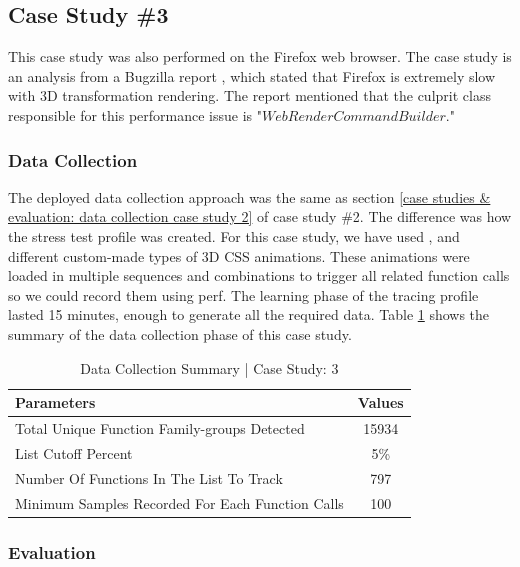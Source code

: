 \documentclass[pdflatex,sn-nature]{sn-jnl}%
\theoremstyle{thmstyleone}%
\theoremstyle{thmstyletwo}%
\theoremstyle{thmstylethree}%
\begin{document}
\subsection{Case Study \#3}\label{case studies & evaluation: case study 3}

This case study was also performed on the Firefox web browser. The case study is an analysis from a Bugzilla report \cite{muizelaar-2020}, which stated that Firefox is extremely slow with 3D transformation rendering. The report mentioned that the culprit class responsible for this performance issue is "$WebRenderCommandBuilder$."

\subsubsection{Data Collection}
The deployed data collection approach was the same as section \ref{case studies & evaluation: data collection case study 2} of case study \#2. The difference was how the stress test profile was created. For this case study, we have used \cite{loopingsquares}, \cite{3dtransformation} and different custom-made types of 3D CSS animations. These animations were loaded in multiple sequences and combinations to trigger all related function calls so we could record them using perf. The learning phase of the tracing profile lasted 15 minutes, enough to generate all the required data. Table \ref{tabledatacollectioncs3} shows the summary of the data collection phase of this case study.

\begin{table}[tbp]

\centering
\begin{tabular}{ |l|c| }
\hline
\textbf{Parameters} & \textbf{Values} \\
\hline
Total Unique Function Family-groups Detected & 15934 \\
\hline
List Cutoff Percent & 5\% \\
\hline
Number Of Functions In The List To Track & 797 \\
\hline
Minimum Samples Recorded For Each Function Calls & 100 \\
\hline
\end{tabular}%
\caption{Data Collection Summary | Case Study: 3}
\label{tabledatacollectioncs3}
\end{table}


\subsubsection{Evaluation}
\end{document}
